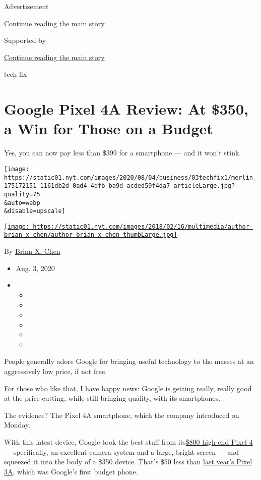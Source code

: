 Advertisement

\protect\hyperlink{after-top}{Continue reading the main story}

Supported by

\protect\hyperlink{after-sponsor}{Continue reading the main story}

tech fix

\hypertarget{google-pixel-4a-review-at-350-a-win-for-those-on-a-budget}{%
\section{Google Pixel 4A Review: At \$350, a Win for Those on a
Budget}\label{google-pixel-4a-review-at-350-a-win-for-those-on-a-budget}}

Yes, you can now pay less than \$399 for a smartphone --- and it won't
stink.

\texttt{[image: https://static01.nyt.com/images/2020/08/04/business/03techfix1/merlin\_175172151\_1161db2d-0ad4-4dfb-ba9d-acded59f4da7-articleLarge.jpg?quality=75\\\&auto=webp\\\&disable=upscale]}

\href{https://www.nytimes.com/by/brian-x-chen}{\texttt{[image: https://static01.nyt.com/images/2018/02/16/multimedia/author-brian-x-chen/author-brian-x-chen-thumbLarge.jpg]}}

By \href{https://www.nytimes.com/by/brian-x-chen}{Brian X. Chen}

\begin{itemize}
\item
  Aug. 3, 2020
\item
  \begin{itemize}
  \item
  \item
  \item
  \item
  \item
  \item
  \end{itemize}
\end{itemize}

People generally adore Google for bringing useful technology to the
masses at an aggressively low price, if not free.

For those who like that, I have happy news: Google is getting really,
really good at the price cutting, while still bringing quality, with its
smartphones.

The evidence? The Pixel 4A smartphone, which the company introduced on
Monday.

With this latest device, Google took the best stuff from
its\href{https://www.nytimes.com/2019/10/21/technology/personaltech/pixel-4-review.html}{\$800
high-end Pixel 4} --- specifically, an excellent camera system and a
large, bright screen --- and squeezed it into the body of a \$350
device. That's \$50 less than
\href{https://www.nytimes.com/2019/05/07/technology/personaltech/pixel-3a.html}{last
year's Pixel 3A}, which was Google's first budget phone.

